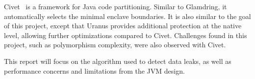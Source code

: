 Civet~\cite{civet} is a framework for Java code partitioning.
Similar to Glamdring, it automatically selects the minimal enclave boundaries.
It is also similar to the goal of this project,
except that Uranus provides additional protection at the native level,
allowing further optimizations compared to Civet.
Challenges found in this project, such as polymorphism complexity, were also observed with Civet.

This report will focus on the algorithm used to detect data leaks,
as well as performance concerns and limitations from the \ac{JVM} design.
